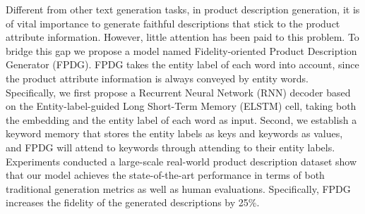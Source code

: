 Different from other text generation tasks, in product description generation, it is of vital importance to generate faithful descriptions that stick to the product attribute information.
However, little attention has been paid to this problem.
To bridge this gap we propose a model named Fidelity-oriented Product Description Generator (FPDG).
FPDG takes the entity label of each word into account, since the product attribute information is always conveyed by entity words. 
Specifically, we first propose a Recurrent Neural Network (RNN) decoder based on the Entity-label-guided Long Short-Term Memory (ELSTM) cell, taking both the embedding and the entity label of each word as input.
Second, we establish a keyword memory that stores the entity labels as keys and keywords as values, and FPDG will attend to keywords through attending to their entity labels.
Experiments conducted a large-scale real-world product description dataset show that our model achieves the state-of-the-art performance in terms of both traditional generation metrics as well as human evaluations.
Specifically, FPDG increases the fidelity of the generated descriptions by 25\%.